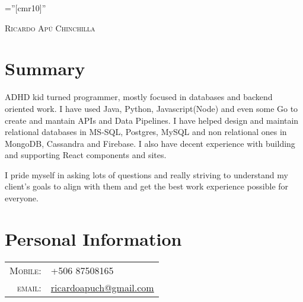 \documentclass[a4paper,11pt]{article}
\begin{document}

\pagestyle{empty} %

\font\fb=''[cmr10]'' %

\par{\centering
		{\Huge   \textsc{Ricardo Apú Chinchilla}
	}\bigskip\par}

\section{Summary}


ADHD kid turned programmer, mostly focused in databases and backend oriented work. I have used Java, Python, Javascript(Node) and even some Go to create and mantain APIs and Data Pipelines. I have helped design and maintain relational databases in MS-SQL, Postgres, MySQL and non relational ones in MongoDB, Cassandra and Firebase. I also have decent experience with building and supporting React components and sites.

I pride myself in asking lots of questions and really striving to understand my client's goals to align  with them and get the best work experience possible for everyone. 

\section{Personal Information}

\begin{tabular}{rl}
    \textsc{Mobile:}     & +506 87508165\\
    \textsc{email:}     & \href{mailto:ricardoapuch@gmail.com}{ricardoapuch@gmail.com}\\
    
\end{tabular}

\end{document}
